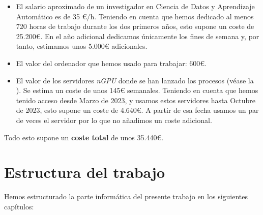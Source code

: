 \begin{itemize}
	\item El salario aproximado de un investigador en Ciencia de Datos y Aprendizaje Automático es de 35 €/h. Teniendo en cuenta que hemos dedicado al menos 720 horas de trabajo durante los dos primeros años, esto supone un coste de 25.200€. En el año adicional dedicamos únicamente los fines de semana y, por tanto, estimamos unos 5.000€ adicionales.
	\item El valor del ordenador que hemos usado para trabajar: 600€.
	\item El valor de los servidores \textit{nGPU} donde se han lanzado los procesos (véase la ). Se estima un coste de unos 145€ semanales. Teniendo en cuenta que hemos tenido acceso desde Marzo de 2023, y usamos estos servidores hasta Octubre de 2023, esto supone un coste de 4.640€. A partir de esa fecha usamos un par de veces el servidor por lo que no añadimos un coste adicional.
\end{itemize}

Todo esto supone un \textbf{coste total} de unos 35.440€.

\section{Estructura del trabajo}

Hemos estructurado la parte informática del presente trabajo en los siguientes capítulos:

